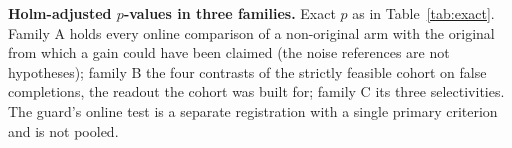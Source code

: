 \begin{table}[h]
\centering\small

\caption{\textbf{Holm-adjusted $p$-values in three families.} Exact $p$ as in Table~\ref{tab:exact}. Family A holds every online comparison of a non-original arm with the original from which a gain could have been claimed (the noise references are not hypotheses); family B the four contrasts of the strictly feasible cohort on false completions, the readout the cohort was built for; family C its three selectivities. The guard's online test is a separate registration with a single primary criterion and is not pooled.}
\label{tab:holm}
\end{table}
